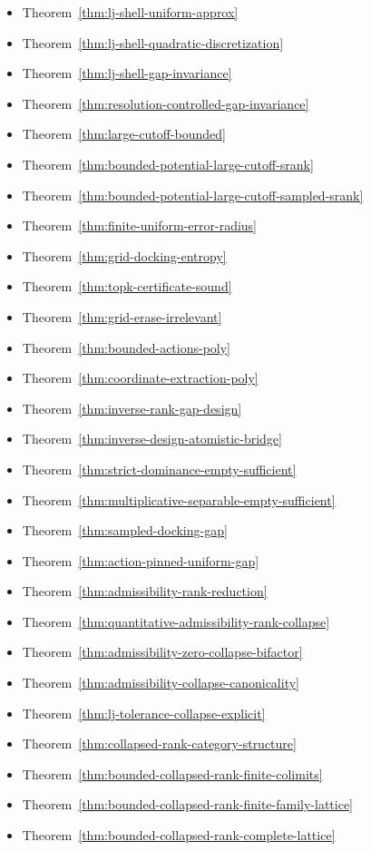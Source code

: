 \begin{itemize}
\item Theorem~\ref{thm:lj-shell-uniform-approx}
\item Theorem~\ref{thm:lj-shell-quadratic-discretization}
\item Theorem~\ref{thm:lj-shell-gap-invariance}
\item Theorem~\ref{thm:resolution-controlled-gap-invariance}
\item Theorem~\ref{thm:large-cutoff-bounded}
\item Theorem~\ref{thm:bounded-potential-large-cutoff-srank}
\item Theorem~\ref{thm:bounded-potential-large-cutoff-sampled-srank}
\item Theorem~\ref{thm:finite-uniform-error-radius}
\item Theorem~\ref{thm:grid-docking-entropy}
\item Theorem~\ref{thm:topk-certificate-sound}
\item Theorem~\ref{thm:grid-erase-irrelevant}
\item Theorem~\ref{thm:bounded-actions-poly}
\item Theorem~\ref{thm:coordinate-extraction-poly}
\item Theorem~\ref{thm:inverse-rank-gap-design}
\item Theorem~\ref{thm:inverse-design-atomistic-bridge}
\item Theorem~\ref{thm:strict-dominance-empty-sufficient}
\item Theorem~\ref{thm:multiplicative-separable-empty-sufficient}
\item Theorem~\ref{thm:sampled-docking-gap}
\item Theorem~\ref{thm:action-pinned-uniform-gap}
\item Theorem~\ref{thm:admissibility-rank-reduction}
\item Theorem~\ref{thm:quantitative-admissibility-rank-collapse}
\item Theorem~\ref{thm:admissibility-zero-collapse-bifactor}
\item Theorem~\ref{thm:admissibility-collapse-canonicality}
\item Theorem~\ref{thm:lj-tolerance-collapse-explicit}
\item Theorem~\ref{thm:collapsed-rank-category-structure}
\item Theorem~\ref{thm:bounded-collapsed-rank-finite-colimits}
\item Theorem~\ref{thm:bounded-collapsed-rank-finite-family-lattice}
\item Theorem~\ref{thm:bounded-collapsed-rank-complete-lattice}

\end{itemize}
